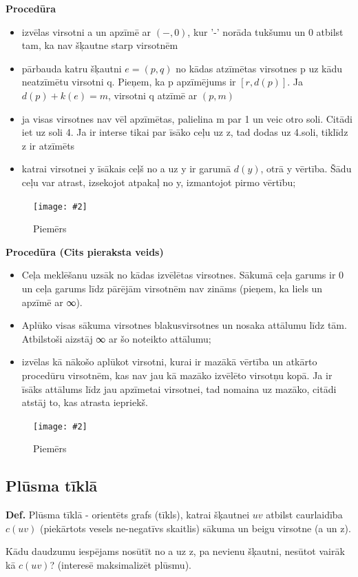 \documentclass{article}
\newcommand{\illustration}[3]{
	\begin{figure}[H]
		\centering	
		\texttt{[image: \#2]}
		\caption{#3}
	\end{figure}
}
\begin{document}
\textbf{Procedūra}
\begin{itemize}
	\item izvēlas virsotni a un apzīmē ar $(−, 0)$, kur '-' norāda tukšumu un 0 atbilst tam, ka nav šķautne starp virsotnēm
	\item pārbauda katru šķautni $e = (p, q)$ no kādas atzīmētas virsotnes p uz kādu neatzīmētu virsotni q. Pieņem, ka p apzīmējums ir $[r , d(p)]$. Ja $d(p) + k(e) = m$, virsotni q atzīmē ar $(p, m)$
	\item ja visas virsotnes nav vēl apzīmētas, palielina m par 1 un veic otro soli. Citādi iet uz soli 4. Ja ir interse tikai par īsāko ceļu uz z, tad dodas uz 4.soli, tiklīdz z ir atzīmēts
	\item katrai virsotnei y īsākais ceļš no a uz y ir garumā $d(y)$, otrā y vērtība. Šādu ceļu var atrast, izsekojot atpakaļ no y, izmantojot pirmo vērtību;
\end{itemize}

\illustration{1}{daikstra-1}{Piemērs}

\textbf{Procedūra (Cits pieraksta veids)}

\begin{itemize}
	\item Ceļa meklēšanu uzsāk no kādas izvēlētas virsotnes. Sākumā ceļa garums ir 0 un ceļa garums līdz pārējām virsotnēm nav zināms (pieņem, ka liels un apzīmē ar ∞).
	\item Aplūko visas sākuma virsotnes blakusvirsotnes un nosaka attālumu līdz tām.  Atbilstoši aizstāj ∞ ar šo noteikto attālumu;
	\item izvēlas kā nākošo aplūkot virsotni, kurai ir mazākā vērtība un atkārto procedūru virsotnēm, kas nav jau kā mazāko izvēlēto virsotņu kopā. Ja ir īsāks attālums līdz jau apzīmetai virsotnei, tad nomaina uz mazāko, citādi atstāj to, kas atrasta iepriekš.
\end{itemize}
	
\illustration{1}{daikstra-2}{Piemērs}

\subsection{Plūsma tīklā}

\textbf{Def.} Plūsma tīklā - orientēts grafs (tīkls), katrai šķautnei $uv$ atbilst caurlaidība $c(uv)$ (piekārtots vesels ne-negatīvs skaitlis) sākuma un beigu virsotne (a un z).

Kādu daudzumu iespējams nosūtīt no a uz z, pa nevienu šķautni, nesūtot vairāk kā $c(uv)$? (interesē maksimalizēt plūsmu).
\end{document}
